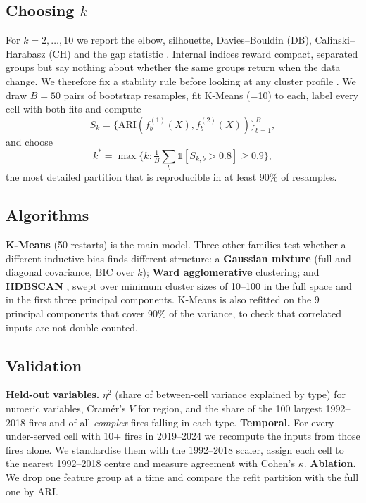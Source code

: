 \documentclass[10pt,twocolumn,letterpaper]{article}
\newcommand{\code}[1]{\texttt{\detokenize{#1}}}
\begin{document}
\subsection{Choosing $k$}
For $k=2,\dots,10$ we report the elbow, silhouette, Davies--Bouldin (DB), Calinski--Harabasz (CH) and the gap statistic \cite{tibshirani2001}. Internal indices reward compact, separated groups but say nothing about whether the same groups return when the data change. We therefore fix a stability rule before looking at any cluster profile \cite{benhur2002}. We draw $B=50$ pairs of bootstrap resamples, fit K-Means (\code{n_init}=10) to each, label every cell with both fits and compute
\begin{equation}
S_k = \big\{\text{ARI}(f^{(1)}_b(X), f^{(2)}_b(X))\big\}_{b=1}^{B},
\end{equation}
and choose
\begin{equation}
k^\ast = \max\{k : \tfrac{1}{B}\textstyle\sum_b \mathbb{1}[S_{k,b} > 0.8] \geq 0.9\},
\end{equation}
the most detailed partition that is reproducible in at least 90\% of resamples.

\subsection{Algorithms}
\textbf{K-Means} (50 restarts) is the main model. Three other families test whether a different inductive bias finds different structure: a \textbf{Gaussian mixture} (full and diagonal covariance, BIC over $k$); \textbf{Ward agglomerative} clustering; and \textbf{HDBSCAN} \cite{campello2013}, swept over minimum cluster sizes of 10--100 in the full space and in the first three principal components. K-Means is also refitted on the 9 principal components that cover 90\% of the variance, to check that correlated inputs are not double-counted.

\subsection{Validation}
\textbf{Held-out variables.} $\eta^2$ (share of between-cell variance explained by type) for numeric variables, Cram\'er's $V$ for region, and the share of the 100 largest 1992--2018 fires and of all \emph{complex} fires falling in each type. \textbf{Temporal.} For every under-served cell with 10+ fires in 2019--2024 we recompute the inputs from those fires alone. We standardise them with the 1992--2018 scaler, assign each cell to the nearest 1992--2018 centre and measure agreement with Cohen's $\kappa$. \textbf{Ablation.} We drop one feature group at a time and compare the refit partition with the full one by ARI.
\end{document}
